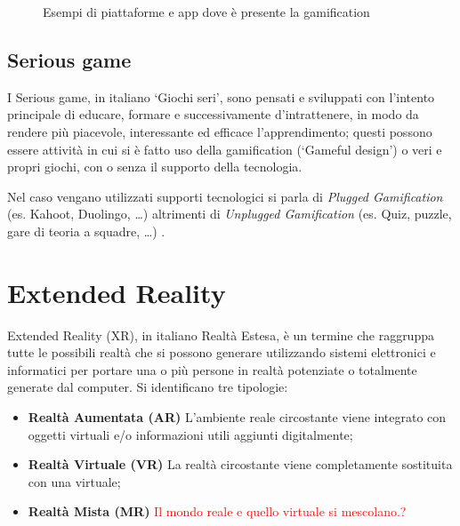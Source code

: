 \begin{figure}
{        \label{fig:waze-level}
    }
    \caption{Esempi di piattaforme e app dove è presente la gamification} 
    \label{fig:gamification-example}
\end{figure}

\subsection{Serious game}
I Serious game, in italiano \enquote*{Giochi seri}, sono pensati e sviluppati con l'intento principale di educare, formare e successivamente d'intrattenere, in modo da rendere più piacevole, interessante ed efficace l'apprendimento; questi possono essere attività in cui si è fatto uso della gamification (\enquote*{Gameful design}) o veri e propri giochi, con o senza il supporto della tecnologia.

Nel caso vengano utilizzati supporti tecnologici si parla di \textit{Plugged Gamification} (es. Kahoot, Duolingo, \dots) altrimenti di \textit{Unplugged Gamification} (es. Quiz, puzzle, gare di teoria a squadre, \dots) \cite{pluggedGamificSeriousGame}.

\cite{seriousgame_langLearn}



%
\section{Extended Reality}
Extended Reality (XR), in italiano Realtà Estesa, è un termine che raggruppa tutte le possibili realtà che si possono generare utilizzando sistemi elettronici e informatici per portare una o più persone in realtà potenziate o totalmente generate dal computer.
Si identificano tre tipologie:

\begin{itemize}
    \item \textbf{Realtà Aumentata (AR)} L'ambiente reale circostante viene integrato con oggetti virtuali e/o informazioni utili aggiunti digitalmente;
    \item \textbf{Realtà Virtuale (VR)} La realtà circostante viene completamente sostituita con una virtuale;
    \item \textbf{Realtà Mista (MR)} \textcolor{red}{Il mondo reale e quello virtuale si mescolano.?}
\end{itemize}

